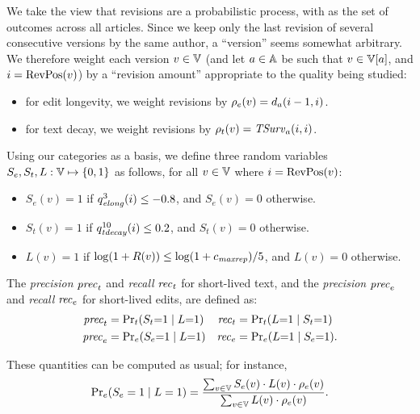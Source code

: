 We take the view that revisions are a probabilistic
process, with \versions{} as the set of outcomes across
all articles.
Since we keep only the last revision of several consecutive
versions by the same author, a ``version'' seems somewhat arbitrary.
We therefore weight each version $v \in \versions{}$
(and let $a \in \mathbb{A}$ be such that $v \in \versions{a}$,
and $i = \mathrm{RevPos}(v)$)
by a ``revision amount'' appropriate to the quality being studied:
\begin{itemize}
\item for edit longevity, we weight revisions by
        $\rho_e(v) = d_{a}(i-1,i)$.
\item for text decay, we weight revisions by
        $\rho_t(v) = \mathit{TSurv}_{a}(i,i)$.
\end{itemize}


Using our categories as a basis,
we define three random variables $S_e, S_t, L: \versions{}
\mapsto \set{0,1}$ as follows, for all $v \in \versions{}$ where
$i = \mathrm{RevPos}(v)$:
%
\begin{itemize} 

\item $S_e(v)=1$ if $\quality{elong}{3}{i} \leq -0.8$, and $S_e(v)=0$ otherwise.
\item $S_t(v)=1$ if $\quality{tdecay}{10}{i} \leq  0.2$, and $S_t(v)=0$ otherwise.
\item $L(v)=1$ if $\log (1+R(v)) \leq \log(1+{c_{{\text{\textit{maxrep}}}}}) / 5$,
  and $L(v)=0$ otherwise.

\end{itemize}
%
The {\em precision\/} ${\text{\textit{prec}}}_t$ and {\em recall\/} ${\text{\textit{rec}}}_t$
for short-lived text, and 
the {\em precision\/} ${\text{\textit{prec}}}_e$ and {\em recall\/} ${\text{\textit{rec}}}_e$
for short-lived edits, are defined as:
%
\begin{align*}
    {\text{\textit{prec}}}_t & = \textstyle\Pr_t(S_t{=}1 \mid L{=}1) 
  & {\text{\textit{rec}}}_t & = \textstyle\Pr_t(L{=}1 \mid S_t{=}1) \\
    {\text{\textit{prec}}}_e & = \textstyle\Pr_e(S_e{=}1 \mid L{=}1) 
  & {\text{\textit{rec}}}_e & = \textstyle\Pr_e(L{=}1 \mid S_e{=}1).
\end{align*}
\begin{comment}
\ifshort
For short-lived text, the {\em precision\/} is 
$
  \textstyle \prect = \Pr_t(S_t=1 \mid L=1)
$,
and the {\em recall\/} is 
$
  \textstyle \recallt = \Pr_t(L=1 \mid S_t=1)
$.
Similarly, for short-lived edits, we define the 
precision is $\prece = \Pr_e(S_e=1 \mid L=1)$, 
and the recall is $\recalle = \Pr_e(L=1 \mid S_e=1)$.
\fi
\end{comment}
These quantities can be computed as usual; for instance, 
\begin{equation*}
  {\textstyle \Pr_e} (S_e=1 \mid L=1) = 
  \frac{\sum_{v \in \versions{}} S_e(v) \cdot L(v) \cdot \editmass(v)}{%
    \sum_{v \in \versions{}} L(v) \cdot \editmass(v)}.
\end{equation*}


